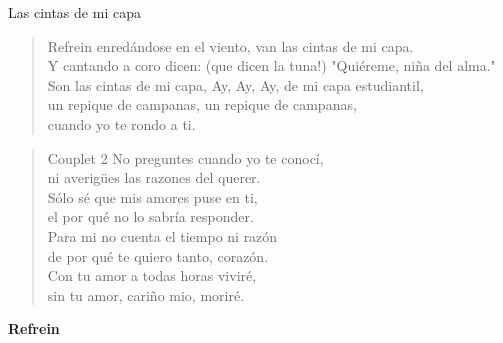 \begin{song}{Las cintas de mi capa}
\begin{verse}{Refrein}
enredándose en el viento, van las cintas de mi capa.\\
Y cantando a coro dicen: (que dicen la tuna!) "Quiéreme, niña del alma."\\
Son las cintas de mi capa, Ay, Ay, Ay, de mi capa estudiantil,\\
un repique de campanas, un repique de campanas, \hspace{1em}\\
\hspace{2em} cuando yo te rondo a ti. \hspace{1em} \hspace{2em} 
\end{verse}
\clearpage
\begin{verse}{Couplet 2}
No preguntes cuando yo te conocí,\\
ni averigües las razones del querer.\\
Sólo sé que mis amores puse en ti,\\
el por qué no lo sabría responder.\\
Para mi no cuenta el tiempo ni razón\\
de por qué te quiero tanto, corazón.\\
Con tu amor a todas horas viviré,\\
sin tu amor, cariño mio, moriré. \hspace{2em}  \hspace{2.5em} \hspace{1em} 
\end{verse}
\textbf{Refrein}
\end{song}

